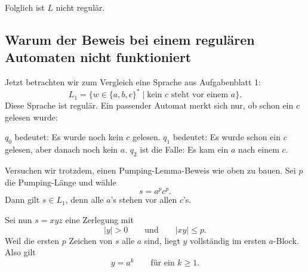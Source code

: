 \documentclass[a4paper,12pt]{article}
\newcommand{\block}[4]{%
    \draw[fill=#4!25] (#1,0) rectangle ++(#2,0.65);
    \node at ({#1 + #2/2},0.325) {#3};
}
\begin{document}
Folglich ist $L$ nicht regulär.

\newpage
\subsection*{Warum der Beweis bei einem regulären Automaten nicht funktioniert}

Jetzt betrachten wir zum Vergleich eine Sprache aus Aufgabenblatt 1:
\[
L_1=\{w\in\{a,b,c\}^*\mid \text{kein } c \text{ steht vor einem } a\}.
\]
Diese Sprache ist regulär. Ein passender Automat merkt sich nur, ob schon ein $c$ gelesen wurde:

\begin{center}
\end{center}

$q_0$ bedeutet: Es wurde noch kein $c$ gelesen.
$q_1$ bedeutet: Es wurde schon ein $c$ gelesen, aber danach noch kein $a$.
$q_2$ ist die Falle: Es kam ein $a$ nach einem $c$.

\medskip
Versuchen wir trotzdem, einen Pumping-Lemma-Beweis wie oben zu bauen.
Sei $p$ die Pumping-Länge und wähle
\[
    s=a^pc^p.
\]
Dann gilt $s\in L_1$, denn alle $a$'s stehen vor allen $c$'s.

\medskip
Sei nun $s=xyz$ eine Zerlegung mit
\[
    |y|>0
    \qquad\text{und}\qquad
    |xy|\le p.
\]
Weil die ersten $p$ Zeichen von $s$ alle $a$ sind, liegt $y$ vollständig im ersten $a$-Block.
Also gilt
\[
    y=a^k
    \qquad\text{für ein } k\ge 1.
\]

\begin{center}
\end{center}
\end{document}

